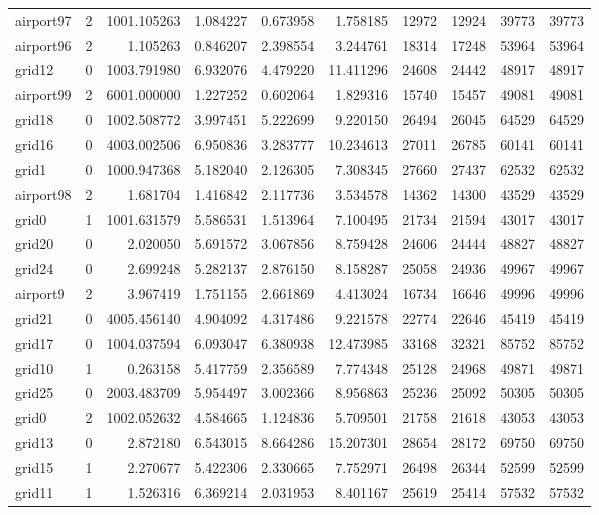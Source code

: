\begin{longtable}{|l|r|r|r|r|r|r|r|r|r|}
airport97 & 2 & 1001.105263 & 1.084227 & 0.673958 & 1.758185 & 12972 & 12924 & 39773 & 39773 \\
airport96 & 2 & 1.105263 & 0.846207 & 2.398554 & 3.244761 & 18314 & 17248 & 53964 & 53964 \\
grid12 & 0 & 1003.791980 & 6.932076 & 4.479220 & 11.411296 & 24608 & 24442 & 48917 & 48917 \\
airport99 & 2 & 6001.000000 & 1.227252 & 0.602064 & 1.829316 & 15740 & 15457 & 49081 & 49081 \\
grid18 & 0 & 1002.508772 & 3.997451 & 5.222699 & 9.220150 & 26494 & 26045 & 64529 & 64529 \\
grid16 & 0 & 4003.002506 & 6.950836 & 3.283777 & 10.234613 & 27011 & 26785 & 60141 & 60141 \\
grid1 & 0 & 1000.947368 & 5.182040 & 2.126305 & 7.308345 & 27660 & 27437 & 62532 & 62532 \\
airport98 & 2 & 1.681704 & 1.416842 & 2.117736 & 3.534578 & 14362 & 14300 & 43529 & 43529 \\
grid0 & 1 & 1001.631579 & 5.586531 & 1.513964 & 7.100495 & 21734 & 21594 & 43017 & 43017 \\
grid20 & 0 & 2.020050 & 5.691572 & 3.067856 & 8.759428 & 24606 & 24444 & 48827 & 48827 \\
grid24 & 0 & 2.699248 & 5.282137 & 2.876150 & 8.158287 & 25058 & 24936 & 49967 & 49967 \\
airport9 & 2 & 3.967419 & 1.751155 & 2.661869 & 4.413024 & 16734 & 16646 & 49996 & 49996 \\
grid21 & 0 & 4005.456140 & 4.904092 & 4.317486 & 9.221578 & 22774 & 22646 & 45419 & 45419 \\
grid17 & 0 & 1004.037594 & 6.093047 & 6.380938 & 12.473985 & 33168 & 32321 & 85752 & 85752 \\
grid10 & 1 & 0.263158 & 5.417759 & 2.356589 & 7.774348 & 25128 & 24968 & 49871 & 49871 \\
grid25 & 0 & 2003.483709 & 5.954497 & 3.002366 & 8.956863 & 25236 & 25092 & 50305 & 50305 \\
grid0 & 2 & 1002.052632 & 4.584665 & 1.124836 & 5.709501 & 21758 & 21618 & 43053 & 43053 \\
grid13 & 0 & 2.872180 & 6.543015 & 8.664286 & 15.207301 & 28654 & 28172 & 69750 & 69750 \\
grid15 & 1 & 2.270677 & 5.422306 & 2.330665 & 7.752971 & 26498 & 26344 & 52599 & 52599 \\
grid11 & 1 & 1.526316 & 6.369214 & 2.031953 & 8.401167 & 25619 & 25414 & 57532 & 57532 \\

\end{longtable}
